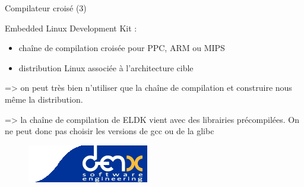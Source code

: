 \documentclass[12pt, t]{beamer}
\newcommand{\bi}{\begin{itemize}}
\newcommand{\ei}{\end{itemize}}
\begin{document}
\begin{frame}{Compilateur croisé (3)}

    \vspace{15pt}
    Embedded Linux Development Kit :
    \bi
    \itemsep6pt
    \item chaîne de compilation croisée pour PPC, ARM ou MIPS
    \item distribution Linux associée à l'architecture cible
    \ei

    {
        \vspace{15pt}
        => on peut très bien n'utiliser que la chaîne de compilation et
        construire nous même la distribution.
    }

    {
        \vspace{15pt}
        => la chaîne de compilation de ELDK vient avec des librairies
        précompilées. On ne peut donc pas choisir les versions de gcc ou de la
        glibc
    }

    {
        \vspace{-10pt}
        \begin{figure}
            \centering
            \hspace{140pt}\includegraphics[scale=0.9]{denx.png}
        \end{figure}
    }
\end{frame}
\end{document}
